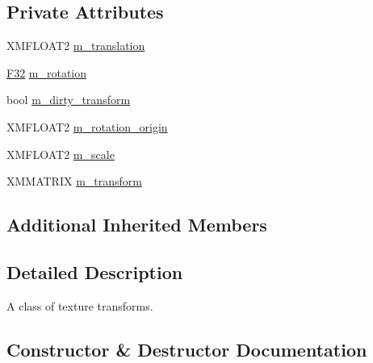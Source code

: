 \subsection*{Private Attributes}
\begin{DoxyCompactItemize}
\item 
X\+M\+F\+L\+O\+A\+T2 \hyperlink{classmage_1_1_texture_transform_a6b468f62dc90f84bbf877192ff167c22}{m\+\_\+translation}
\item 
\hyperlink{namespacemage_aa97e833b45f06d60a0a9c4fc22ae02c0}{F32} \hyperlink{classmage_1_1_texture_transform_aa9b56aac4354fa7f37caee42451f60d1}{m\+\_\+rotation}
\item 
bool \hyperlink{classmage_1_1_texture_transform_a7d23cd89e4ab16e08a214272d280c5e2}{m\+\_\+dirty\+\_\+transform}
\item 
X\+M\+F\+L\+O\+A\+T2 \hyperlink{classmage_1_1_texture_transform_a6be18aac7ead059bb2ea4b3a464e0272}{m\+\_\+rotation\+\_\+origin}
\item 
X\+M\+F\+L\+O\+A\+T2 \hyperlink{classmage_1_1_texture_transform_a57ecf30158fc8ba715c40742f1afa0bd}{m\+\_\+scale}
\item 
X\+M\+M\+A\+T\+R\+IX \hyperlink{classmage_1_1_texture_transform_ad801f906833544ca476908c241945ed6}{m\+\_\+transform}
\end{DoxyCompactItemize}
\subsection*{Additional Inherited Members}


\subsection{Detailed Description}
A class of texture transforms. 

\subsection{Constructor \& Destructor Documentation}
\hypertarget{classmage_1_1_texture_transform_a9c0f8f7f31f283b0877037489ddb2d0b}{}\label{classmage_1_1_texture_transform_a9c0f8f7f31f283b0877037489ddb2d0b} 
